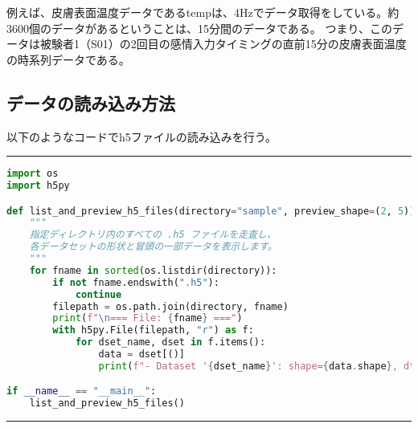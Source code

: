 \documentclass[a4paper,11pt]{article}
\begin{document}
例えば、皮膚表面温度データであるtempは、4Hzでデータ取得をしている。約3600個のデータがあるということは、15分間のデータである。
つまり、このデータは被験者1（S01）の2回目の感情入力タイミングの直前15分の皮膚表面温度の時系列データである。



\newpage
\subsection*{データの読み込み方法}
以下のようなコードでh5ファイルの読み込みを行う。

\vspace{5ex}\hrule\vspace{1ex}
\begin{lstlisting}[language=Python, caption={HDF5ファイル読み込み関数}, label={lst:list_h5}]
import os
import h5py

def list_and_preview_h5_files(directory="sample", preview_shape=(2, 5)):
    """
    指定ディレクトリ内のすべての .h5 ファイルを走査し、
    各データセットの形状と冒頭の一部データを表示します。
    """
    for fname in sorted(os.listdir(directory)):
        if not fname.endswith(".h5"):
            continue
        filepath = os.path.join(directory, fname)
        print(f"\n=== File: {fname} ===")
        with h5py.File(filepath, "r") as f:
            for dset_name, dset in f.items():
                data = dset[()]
                print(f"- Dataset '{dset_name}': shape={data.shape}, dtype={data.dtype}")

if __name__ == "__main__":
    list_and_preview_h5_files()
\end{lstlisting}
\vspace{1ex}\hrule\vspace{1ex}

\newpage
\end{document}
